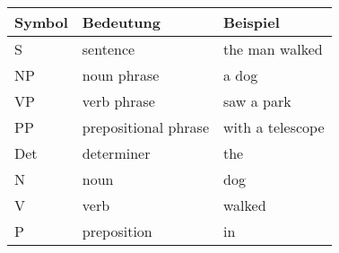 \documentclass[10pt,a4paper]{article}
\begin{document}
	\begin{table}[H]
		\centering
		\begin{tabular}{ l|l|l }
			Symbol & Bedeutung &Beispiel\\
			\hline
			S&	sentence	&the man walked\\
			NP&	noun phrase&	a dog\\
			VP&	verb phrase&	saw a park\\
			PP&	prepositional phrase&	with a telescope\\
			Det&	determiner&	the\\
			N&	noun&	dog\\
			V&	verb&	walked\\
			P&	preposition&	in
		\end{tabular}
	\end{table}
	
\end{document}
